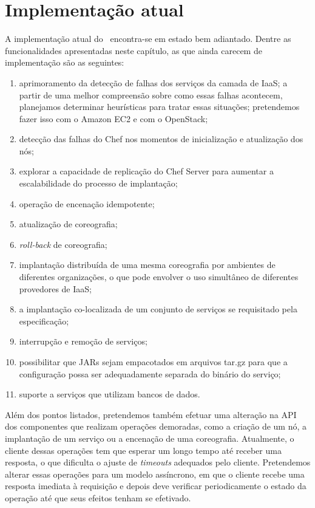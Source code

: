 \section{Implementação atual}
\label{sec:impl_atual}

A implementação atual do \ee\ encontra-se em estado bem adiantado. Dentre as funcionalidades apresentadas neste capítulo, as que ainda carecem de implementação são as seguintes:

\begin{enumerate}
\item aprimoramento da detecção de falhas dos serviços da camada de IaaS; a partir de uma melhor compreensão sobre como essas falhas acontecem, planejamos determinar heurísticas para tratar essas situações; pretendemos fazer isso com o Amazon EC2 e com o OpenStack;
\item detecção das falhas do Chef nos momentos de inicialização e atualização dos nós;
\item explorar a capacidade de replicação do Chef Server para aumentar a escalabilidade do processo de implantação;
\item operação de encenação idempotente;
\item atualização de coreografia;
\item \textit{roll-back} de coreografia;
\item implantação distribuída de uma mesma coreografia por ambientes de diferentes organizações, o que pode envolver o uso simultâneo de diferentes provedores de IaaS;
\item a implantação co-localizada de um conjunto de serviços se requisitado pela especificação;
\item interrupção e remoção de serviços;
\item possibilitar que JARs sejam empacotados em arquivos tar.gz para que a configuração possa ser adequadamente separada do binário do serviço;
\item suporte a serviços que utilizam bancos de dados.
\end{enumerate}

Além dos pontos listados, pretendemos também efetuar uma alteração na API dos componentes que realizam operações demoradas, como a criação de um nó, a implantação de um serviço ou a encenação de uma coreografia. Atualmente, o cliente dessas operações tem que esperar um longo tempo até receber uma resposta, o que dificulta o ajuste de \textit{timeouts} adequados pelo cliente. Pretendemos alterar essas operações para um modelo assíncrono, em que o cliente recebe uma resposta imediata à requisição e depois deve verificar periodicamente o estado da operação até que seus efeitos tenham se efetivado.

